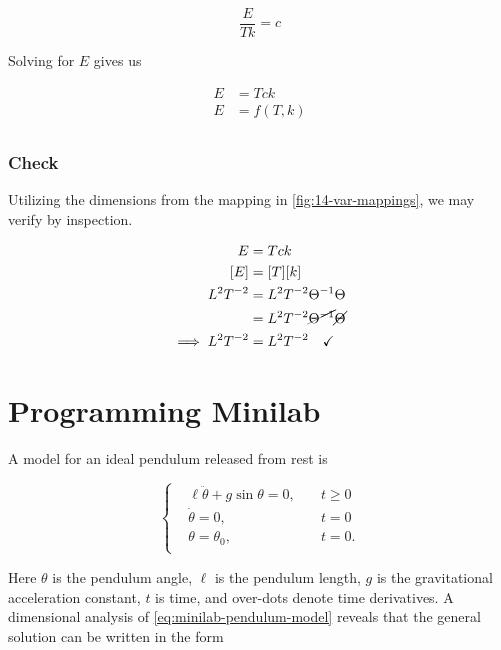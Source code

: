 \documentclass[12pt]{article}
\begin{document}
  \begin{equation}
    \frac{E}{Tk} = c
  \end{equation}

  Solving for $E$ gives us

  \begin{equation}
    \boxed{
      \begin{aligned}
        E &= Tck \\
        E &= f(T,k) \\
      \end{aligned}
    }
  \end{equation}

  \subsubsection*{Check}
  Utilizing the dimensions from the mapping in \cref{fig:14-var-mappings}, we
  may verify by inspection.

  \begin{equation}
    \begin{aligned}
      E &= Tck \\
      [E] &= [T][k] \\
      L^2T^{-2} &= L^2T^{-2}\Theta^{-1} \Theta \\
       &= L^2T^{-2} \cancel{\Theta^{-1}} \cancel{\Theta} \\
      \implies L^2T^{-2} &= L^2T^{-2} \quad\checkmark \\
    \end{aligned}
  \end{equation}


\section{Programming Minilab}
A model for an ideal pendulum released from rest is

\begin{equation}
  \label{eq:minilab-pendulum-model}
   \left\{
  \begin{aligned}
    &\ell\ddot{\theta}+g\sin\theta = 0, \quad & t\ge0 \\
    &\dot{\theta} = 0, \quad & t = 0 \\
    &\theta = \theta_0, \quad & t = 0. \\
  \end{aligned}\right.
\end{equation}

Here $\theta$ is the pendulum angle, $\ell$ is the pendulum length, $g$ is the
gravitational acceleration constant, $t$ is time, and over-dots denote time
derivatives. A dimensional analysis of \cref{eq:minilab-pendulum-model} reveals
that the general solution can be written in the form
\end{document}
